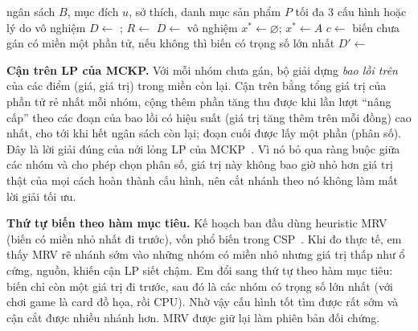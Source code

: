 \begin{algorithm}[H]
\caption{Tìm cấu hình tối ưu (rút gọn)}
\label{alg:solve}
\begin{algorithmic}[1]
\Require ngân sách $B$, mục đích $u$, sở thích, danh mục sản phẩm $P$
\Ensure tối đa 3 cấu hình hoặc lý do vô nghiệm
\State $D \gets$ ; \; $R \gets$ 
\State $D \gets$ 
 \Return vô nghiệm \EndIf
\State $x^{*} \gets \varnothing$; \; 
\State \Return {}
\Statex
{}
     $x^{*} \gets A$ \EndIf
    \State \Return
  \EndIf
  \State $c \gets$ biến chưa gán có miền một phần tử, nếu không thì biến có trọng số lớn nhất
      \State $D' \gets$ 
        \State {}
      \EndIf
    \EndIf
  \EndFor
\EndProcedure
\end{algorithmic}
\end{algorithm}

\textbf{Cận trên LP của MCKP.} Với mỗi nhóm chưa gán, bộ giải dựng \emph{bao lồi trên} của các điểm (giá, giá trị) trong miền còn lại. Cận trên bằng tổng giá trị của phần tử rẻ nhất mỗi nhóm, cộng thêm phần tăng thu được khi lần lượt ``nâng cấp'' theo các đoạn của bao lồi có hiệu suất (giá trị tăng thêm trên mỗi đồng) cao nhất, cho tới khi hết ngân sách còn lại; đoạn cuối được lấy một phần (phân số). Đây là lời giải đúng của nới lỏng LP của MCKP~\cite{sinha,knapsack}. Vì nó bỏ qua ràng buộc giữa các nhóm và cho phép chọn phân số, giá trị này không bao giờ nhỏ hơn giá trị thật của mọi cách hoàn thành cấu hình, nên cắt nhánh theo nó không làm mất lời giải tối ưu.

\textbf{Thứ tự biến theo hàm mục tiêu.} Kế hoạch ban đầu dùng heuristic MRV (biến có miền nhỏ nhất đi trước), vốn phổ biến trong CSP~\cite{aima}. Khi đo thực tế, em thấy MRV rẽ nhánh sớm vào những nhóm có miền nhỏ nhưng giá trị thấp như ổ cứng, nguồn, khiến cận LP siết chậm. Em đổi sang thứ tự theo hàm mục tiêu: biến chỉ còn một giá trị đi trước, sau đó là các nhóm có trọng số lớn nhất (với chơi game là card đồ họa, rồi CPU). Nhờ vậy cấu hình tốt tìm được rất sớm và cận cắt được nhiều nhánh hơn. MRV được giữ lại làm phiên bản đối chứng.

